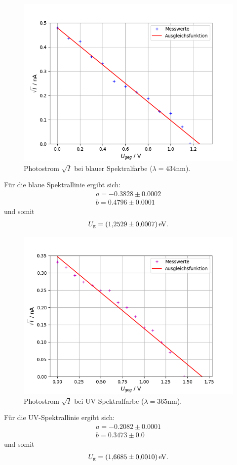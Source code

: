 \begin{figure}[H]
    \centering
    \includegraphics[scale=0.7]{Auswertung/aBlau.png}
    \caption{Photostrom $\sqrt{I}$ bei blauer Spektralfarbe ($\lambda = 434 \text{nm}$).}
    \label{fig:blau}
\end{figure}
Für die blaue Spektrallinie ergibt sich:
\begin{gather*}
	a =  -0.3828 \pm 0.0002\\
	b =  0.4796 \pm 0.0001
\end{gather*}
und somit 
\begin{equation*}
	U_\text{g} = \SI{1.2529 \pm 0.0007}{\eV}  .
\end{equation*}

\begin{figure}[H]
    \centering
    \includegraphics[scale=0.7]{Auswertung/aUv.png}
    \caption{Photostrom $\sqrt{I}$ bei UV-Spektralfarbe ($\lambda = 365 \text{nm}$).}
    \label{fig:UV}
\end{figure}
Für die UV-Spektrallinie ergibt sich:
\begin{gather*}
	a =  -0.2082 \pm 0.0001\\
	b = 0.3473 \pm 0.0
\end{gather*}
und somit 
\begin{equation*}
	U_\text{g} = \SI{1.6685 \pm 0.0010}{\eV} .
\end{equation*}

